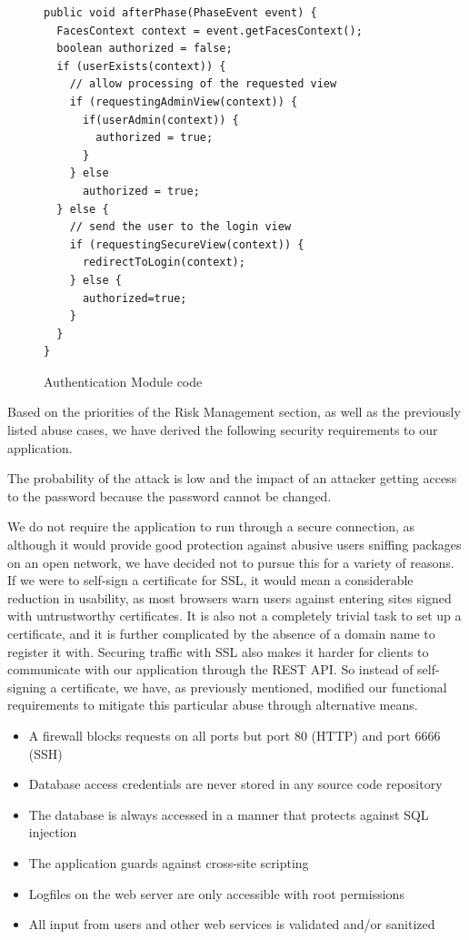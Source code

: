 \documentclass[a4paper]{article}
\begin{document}
  
\begin{figure}
\caption{Authentication Module code}   
\begin{lstlisting}
public void afterPhase(PhaseEvent event) {
  FacesContext context = event.getFacesContext();  
  boolean authorized = false;
  if (userExists(context)) {
    // allow processing of the requested view
    if (requestingAdminView(context)) {
      if(userAdmin(context)) {
        authorized = true; 
      }                     
    } else 
      authorized = true;
  } else {            
    // send the user to the login view
    if (requestingSecureView(context)) {                
      redirectToLogin(context);
    } else {
      authorized=true;
    }
  }
}    
\end{lstlisting} 
\end{figure}

Based on the priorities of the Risk Management section, as well as the previously listed abuse cases, we have derived the following security requirements to our application.

The probability of the attack is low and the impact of an attacker getting access to the password because the password cannot be changed.

We do not require the application to run through a secure connection, as although it would provide good protection against abusive users sniffing packages on an open network, we have decided not to pursue this for a variety of reasons. 
If we were to self-sign a certificate for SSL, it would mean a considerable reduction in usability, as most browsers warn users against entering sites signed with untrustworthy certificates. It is also not a completely trivial task to set up a certificate, and it is further complicated by the absence of a domain name to register it with. Securing traffic with SSL also makes it harder for clients to communicate with our application through the REST API. So instead of self-signing a certificate, we have, as previously mentioned, modified our functional requirements to mitigate this particular abuse through alternative means.
\begin{itemize}
\item A firewall blocks requests on all ports but port 80 (HTTP) and port 6666 (SSH)
\item Database access credentials are never stored in any source code repository
\item The database is always accessed in a manner that protects against SQL injection
\item The application guards against cross-site scripting
\item Logfiles on the web server are only accessible with root permissions
\item All input from users and other web services is validated and/or sanitized
\end{itemize}
\end{document}
